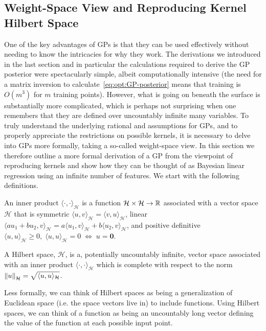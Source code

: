 \subsection{Weight-Space View and Reproducing Kernel Hilbert Space}
\label{sec:opt:gps:weight}

One of the key advantages of GPs is that they can be used effectively without needing
to know the intricacies for why they work.  The derivations we introduced in the
last section and in particular the calculations required to derive the GP posterior were
spectacularly simple, albeit computationally intensive (the need for a matrix inversion
to calculate~\eqref{eq:opt:GP-posterior} means that training is $O(m^3)$ for
$m$ training points).  However, what is going on beneath the surface is substantially
more complicated, which is perhaps not surprising when one remembers that they
are defined over uncountably infinite many variables.  
To truly understand the underlying rational and assumptions for GPs, and to properly
appreciate the restrictions on possible kernels, it is necessary to delve into GPs more
formally, taking a so-called weight-space view.
In this section we therefore outline a more formal derivation of a GP
from the viewpoint of reproducing kernels \citep{hofmann2008kernel}
and show how they can be thought of as Bayesian linear regression
using an infinite number of features.
We start with the following definitions.

\begin{definition}{}
	An inner product $\langle\cdot,\cdot\rangle_{\mathcal{H}}$ is a function $\mathcal{H} \times \mathcal{H} \rightarrow \mathbb{R}$ 
	associated with a vector space $\mathcal{H}$
	that is symmetric $\langle u,v\rangle_{\mathcal{H}}=\langle v,u\rangle_{\mathcal{H}}$, linear $\langle a u_1 + b u_2,v\rangle_{\mathcal{H}} = a \langle u_1,v\rangle_{\mathcal{H}} +b\langle u_2,v\rangle_{\mathcal{H}}$, and positive definitive $\langle u,u\rangle_{\mathcal{H}} \ge 0, \; \langle u,u\rangle_{\mathcal{H}} = 0 \; \Leftrightarrow \; u=\mathbf{0}$.
	\label{opt:def:InnerProduce}
\end{definition}
\begin{definition}{}
	A Hilbert space, $\mathcal{H}$, is a, potentially uncountably infinite, vector space associated with an inner product
	$\langle\cdot,\cdot\rangle_{\mathcal{H}}$ 
	which is complete with respect to the norm $\left\lVert u\right\rVert_{\mathcal{H}} = \sqrt{\langle u,u\rangle_{\mathcal{H}}}$.
	\label{opt:def:HilbertSpace}
\end{definition}
\noindent Less formally, we can think of Hilbert spaces as being a generalization of Euclidean space (i.e. the space vectors live in)
to include functions.  Using Hilbert spaces, we can think of a function as being an uncountably long vector defining
the value of the function at each possible input point.

